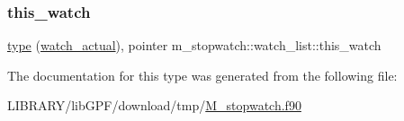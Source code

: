 \subsubsection{\texorpdfstring{this\+\_\+watch}{this\_watch}}
{\footnotesize\ttfamily \hyperlink{stop__watch_83_8txt_a70f0ead91c32e25323c03265aa302c1c}{type} (\hyperlink{structm__stopwatch_1_1watch__actual}{watch\+\_\+actual}), pointer m\+\_\+stopwatch\+::watch\+\_\+list\+::this\+\_\+watch\hspace{0.3cm}{\ttfamily [private]}}



The documentation for this type was generated from the following file\+:\begin{DoxyCompactItemize}
\item 
L\+I\+B\+R\+A\+R\+Y/lib\+G\+P\+F/download/tmp/\hyperlink{M__stopwatch_8f90}{M\+\_\+stopwatch.\+f90}\end{DoxyCompactItemize}
